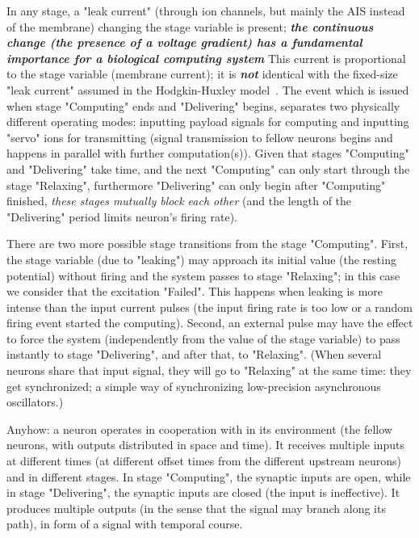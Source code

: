 In any stage, a "leak current" (through ion channels, but mainly the \gls{AIS}
instead of the membrane)
changing the stage variable is present; \textbf{\textit{the continuous change (the presence of a voltage gradient) has a fundamental importance for a biological computing system}}
This current is proportional to the stage variable (membrane current); it is \textbf{\textit{not}} identical with the fixed-size "leak current" assumed in the Hodgkin-Huxley model~\cite{HodgkinHuxley:1952}.
The event which is issued when stage "Computing" ends and "Delivering" begins, separates two physically different operating modes: inputting payload signals for computing
and inputting "servo" ions for transmitting
(signal transmission to fellow neurons begins and happens in parallel
with further computation(s)).
Given that stages "Computing" and "Delivering" take time,
and the next "Computing" can only start through the stage "Relaxing",   
furthermore "Delivering" can only begin after "Computing" finished,
\textit{these stages mutually block each other} (and the length of the "Delivering" period limits neuron's firing rate). 

There are two more possible stage transitions from the stage "Computing".
First, the stage variable (due to "leaking") may approach its initial value (the resting potential) without firing and the system passes to stage "Relaxing"; in this case we consider that the excitation "Failed".
This happens when leaking is more intense than the input current pulses (the input firing rate is too low or a random firing event started the computing).
Second, an external pulse may have the effect to force the system (independently from the value of the stage variable) to pass instantly to stage "Delivering", and after that, to "Relaxing". (When several neurons share that input signal,
they will go to "Relaxing" at the same time: they get synchronized; a simple way of synchronizing low-precision asynchronous oscillators.)


Anyhow: a neuron operates in cooperation with in its environment (the fellow neurons, with outputs distributed in space and time).
It receives multiple inputs at different times (at different offset times from the different upstream neurons) and in different stages. 
In stage "Computing", the synaptic inputs are open, while
in stage "Delivering", the synaptic inputs are closed (the input is ineffective).
It produces multiple outputs (in the sense that the signal may branch along its path), in form of a signal with temporal course.
 

